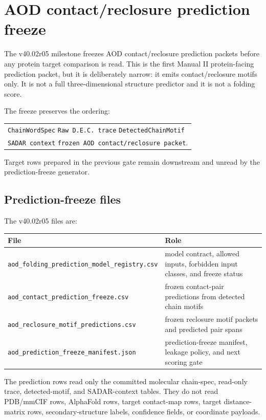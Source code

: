 \section{AOD contact/reclosure prediction freeze}

The v40.02r05 milestone freezes AOD contact/reclosure prediction packets before any protein target comparison is read. This is the first Manual II protein-facing prediction packet, but it is deliberately narrow: it emits contact/reclosure motifs only. It is not a full three-dimensional structure predictor and it is not a folding score.

The freeze preserves the ordering:
\begin{center}
\begin{tabularx}{\linewidth}{@{}X@{}}
\texttt{ChainWordSpec} \textrightarrow{} \texttt{Raw D.E.C. trace} \textrightarrow{} \texttt{DetectedChainMotif} \\
\texttt{SADAR context} \textrightarrow{} \texttt{frozen AOD contact/reclosure packet}.
\end{tabularx}
\end{center}
Target rows prepared in the previous gate remain downstream and unread by the prediction-freeze generator.

\subsection{Prediction-freeze files}

The v40.02r05 files are:
\begin{center}
\begin{tabularx}{\linewidth}{@{}lX@{}}
\toprule
File & Role \\
\midrule
\texttt{aod\_folding\_prediction\_model\_registry.csv} & model contract, allowed inputs, forbidden input classes, and freeze status \\
\texttt{aod\_contact\_prediction\_freeze.csv} & frozen contact-pair predictions from detected chain motifs \\
\texttt{aod\_reclosure\_motif\_predictions.csv} & frozen reclosure motif packets and predicted pair spans \\
\texttt{aod\_prediction\_freeze\_manifest.json} & prediction-freeze manifest, leakage policy, and next scoring gate \\
\bottomrule
\end{tabularx}
\end{center}

The prediction rows read only the committed molecular chain-spec, read-only trace, detected-motif, and SADAR-context tables. They do not read PDB/mmCIF rows, AlphaFold rows, target contact-map rows, target distance-matrix rows, secondary-structure labels, confidence fields, or coordinate payloads.

